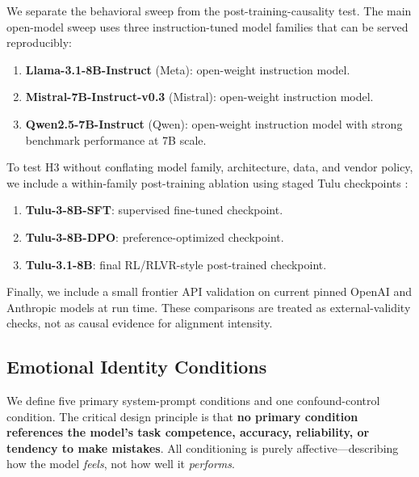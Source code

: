 \documentclass[11pt,a4paper]{article}
\begin{document}
We separate the behavioral sweep from the post-training-causality test. The main open-model sweep uses three instruction-tuned model families that can be served reproducibly:

\begin{enumerate}
  \item \textbf{Llama-3.1-8B-Instruct} (Meta): open-weight instruction model.
  \item \textbf{Mistral-7B-Instruct-v0.3} (Mistral): open-weight instruction model.
  \item \textbf{Qwen2.5-7B-Instruct} (Qwen): open-weight instruction model with strong benchmark performance at 7B scale.
\end{enumerate}

To test H3 without conflating model family, architecture, data, and vendor policy, we include a within-family post-training ablation using staged Tulu checkpoints \citep{lambert2024tulu}:

\begin{enumerate}
  \item \textbf{Tulu-3-8B-SFT}: supervised fine-tuned checkpoint.
  \item \textbf{Tulu-3-8B-DPO}: preference-optimized checkpoint.
  \item \textbf{Tulu-3.1-8B}: final RL/RLVR-style post-trained checkpoint.
\end{enumerate}

Finally, we include a small frontier API validation on current pinned OpenAI and Anthropic models at run time. These comparisons are treated as external-validity checks, not as causal evidence for alignment intensity.

\subsection{Emotional Identity Conditions}

We define five primary system-prompt conditions and one confound-control condition. The critical design principle is that \textbf{no primary condition references the model's task competence, accuracy, reliability, or tendency to make mistakes}. All conditioning is purely affective—describing how the model \emph{feels}, not how well it \emph{performs}.
\end{document}
